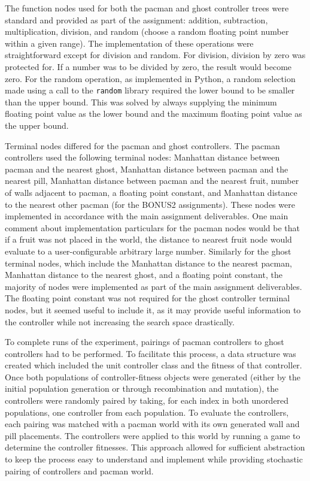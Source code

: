 \documentclass[11pt]{article}
\begin{document}
The function nodes used for both the pacman and ghost controller trees were standard and provided as part of the assignment: 
addition, subtraction, multiplication, division, and random (choose a random floating point number 
within a given range). The implementation of these operations were straightforward except for division and
random. For division, division by zero was protected for. If a number was to be divided by zero, the result
would become zero. For the random operation, as implemented in Python, a random selection made using a call
to the \texttt{random} library required the lower bound to be smaller than the upper bound. This was solved
by always supplying the minimum floating point value as the lower bound and the maximum floating point value
as the upper bound.

Terminal nodes differed for the pacman and ghost controllers. The pacman controllers used the following terminal nodes: 
Manhattan distance between pacman and the nearest ghost, Manhattan distance between pacman and the nearest pill, Manhattan
distance between pacman and the nearest fruit, number of walls adjacent to pacman, a floating point constant, and Manhattan
distance to the nearest other pacman (for the BONUS2 assignments). These nodes were implemented in accordance with the 
main assignment deliverables. One main comment about implementation particulars for the pacman nodes would be that if a fruit
was not placed in the world, the distance to nearest fruit node would evaluate to a user-configurable arbitrary large number.
Similarly for the ghost terminal nodes, which include the Manhattan distance to the nearest pacman, Manhattan distance to
the nearest ghost, and a floating point constant, the majority of nodes were implemented as part of the main assignment deliverables.
The floating point constant was not required for the ghost controller terminal nodes, but it seemed useful to include it, 
as it may provide useful information to the controller while not increasing the search space drastically.

To complete runs of the experiment, pairings of pacman controllers to ghost controllers had to be performed. To facilitate this
process, a data structure was created which included the unit controller class and the fitness of that controller. Once both
populations of controller-fitness objects were generated (either by the initial population generation or through recombination and mutation), the controllers
were randomly paired by taking, for each index in both unordered populations, one controller from each population. To evaluate
the controllers, each pairing was matched with a pacman world with its own generated wall and pill placements. The controllers were applied
to this world by running a game to determine the controller fitnesses. This approach allowed for sufficient abstraction to keep 
the process easy to understand and implement while providing stochastic pairing of controllers and pacman world.
\end{document}

